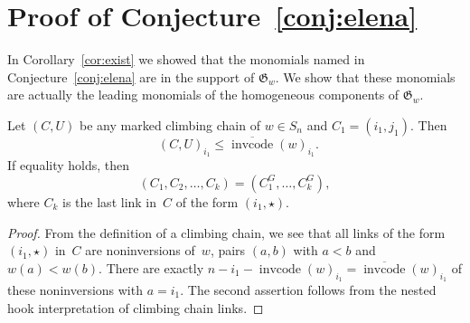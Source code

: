 \documentclass[ALCO]{cedram}
\DeclareMathOperator{\dwt}{\overline{\mathrm{wt}}}
\DeclareMathOperator{\cc}{\mathrm{invcode}}
\newcommand{\occ}{\overline{\cc}}
\newcommand{\CG}{C^G}
\begin{document}
\section{Proof of Conjecture~\ref{conj:elena}}
\label{sec:lead}

In Corollary~\ref{cor:exist} we showed that the monomials named in Conjecture~\ref{conj:elena} are in the support of $\mathfrak{G}_w$. We show that these monomials are actually the leading monomials of the homogeneous components of $\mathfrak{G}_w$.



\begin{lemma}
	\label{lem:maxmarkedones}
	Let $(C,U)$ be any marked climbing chain of $w\in S_n$ and $C_1=(i_1,j_1)$. Then 
	\[\dwt(C,U)_{i_1} \leq \occ(w)_{i_1}.\]
	If equality holds, then 
	\[(C_1,C_2,\ldots,C_k) = (\CG_1,\ldots,\CG_k), \]
	where $C_k$ is the last link in~$C$ of the form $(i_1,\star)$.
\end{lemma}
\begin{proof}
	From the definition of a climbing chain, we see that all links of the form $(i_1,\star)$ in~$C$ are noninversions of~$w$, pairs $(a,b)$ with $a<b$ and $w(a)<w(b)$. There are exactly $n-i_1-\cc(w)_{i_1} = \occ(w)_{i_1}$ of these noninversions with $a=i_1$. The second assertion follows from the nested hook interpretation of climbing chain links.
\end{proof}
\end{document}
